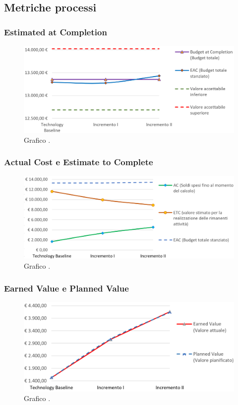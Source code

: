 \subsection{Metriche processi}

\subsubsection{Estimated at Completion}
\begin{figure}[h]
	\centering
	\includegraphics[width=16cm]{Images/BAC-EAC}
	\caption{Graﬁco .}
\end{figure}

\newpage

\subsubsection{Actual Cost e Estimate to Complete}
\begin{figure}[h]
	\centering
	\includegraphics[width=16cm]{Images/ETC-AC}
	\caption{Graﬁco .}
\end{figure}


\subsubsection{Earned Value e Planned Value}
\begin{figure}[h]
	\centering
	\includegraphics[width=16cm]{Images/EV-PV}
	\caption{Graﬁco .}
\end{figure}

